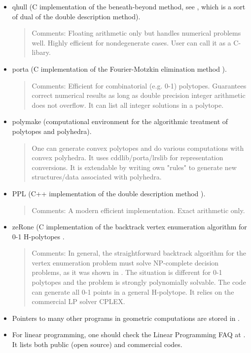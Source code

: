 \documentclass[a4paper,12pt]{article}
\begin{document}
\begin{itemize}
\item qhull \cite{bdh-qach-96,bdh-qach-03} (C implementation of
the beneath-beyond method, see \cite{e-acg-87,m-cg-94},
which is a sort of dual of the double description method). 
\begin{quote}
Comments: Floating arithmetic only but handles numerical problems
well.  Highly efficient for nondegenerate cases.   
User can call it as a C-libary.
\end{quote}

\item porta \cite{cl-porta-97} (C implementation of
the Fourier-Motzkin elimination method \cite{z-lop-94}). 

\begin{quote}
Comments: Efficient for combinatorial (e.g. 0-1) polytopes.
Guarantees correct numerical results as long as
double precision integer arithmetic does not overflow.
It can list all integer solutions in a polytope.
\end{quote}

\item polymake \cite{gj-pm-99} (computational
environment for the algorithmic 
treatment of polytopes and polyhedra). 

\begin{quote}
One can generate convex polytopes and do various computations
with convex polyhedra.  
It uses cddlib/porta/lrslib for representation conversions. 
It is extendable by writing own "rules" to generate
new structures/data associated with polyhedra.
\end{quote}


\item PPL  \cite{b-pplhome} (C++ implementation of the double description method \cite{mrtt-ddm-53}). 
\begin{quote}
Comments: A modern efficient implementation.  Exact arithmetic only.
\end{quote}

\item zeRone \cite{l-zvefzo-99} (C implementation of
the backtrack vertex enumeration algorithm for
0-1 H-polytopes \cite{bl-vs01ps-98}. 

\begin{quote}
Comments: In general, the straightforward backtrack algorithm
for the vertex enumeration problem must solve NP-complete
decision problems, as it was shown in \cite{flm-abala-97}.
The situation is different for 0-1 polytopes and 
the problem is strongly polynomially solvable.  The code
can generate all 0-1 points in a general H-polytope.
It relies on the commercial LP solver CPLEX.
\end{quote}


\item Pointers to many other programs in geometric computations 
are stored in \cite{a-dcg,e-cgp}. 

\item For linear programming, one should check the Linear Programming
FAQ at \cite{fg-lpfaq}.  It lists both public (open source) and commercial
codes.

\end{itemize}
\end{document}
